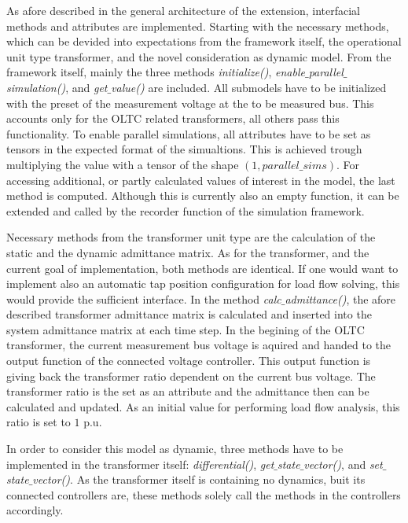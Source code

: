 As afore described in the general architecture of the extension, interfacial methods and attributes are implemented.
Starting with the necessary methods, which can be devided into expectations from the framework itself, the operational unit type transformer, and the novel consideration as dynamic model.
From the framework itself, mainly the three methods \textit{initialize()}, \textit{enable$\_$parallel$\_$simulation()}, and \textit{get$\_$value()} are included.
All submodels have to be initialized with the preset of the measurement voltage at the to be measured bus. 
This accounts only for the \acs{OLTC} related transformers, all others pass this functionality.
To enable parallel simulations, all attributes have to be set as tensors in the expected format of the simualtions.
This is achieved trough multiplying the value with a tensor of the shape $(1, {parallel\_sims})$.
For accessing additional, or partly calculated values of interest in the model, the last method is computed.
Although this is currently also an empty function, it can be extended and called by the recorder function of the simulation framework.

Necessary methods from the transformer unit type are the calculation of the static and the dynamic admittance matrix.
As for the transformer, and the current goal of implementation, both methods are identical.
If one would want to implement also an automatic tap position configuration for load flow solving, this would provide the sufficient interface.
In the method \textit{calc$\_$admittance()}, the afore described transformer admittance matrix is calculated and inserted into the system admittance matrix at each time step.
In the begining of the \acs{OLTC} transformer, the current measurement bus voltage is aquired and handed to the output function of the connected voltage controller.
This output function is giving back the transformer ratio dependent on the current bus voltage. 
The transformer ratio is the set as an attribute and the admittance then can be calculated and updated.
As an initial value for performing load flow analysis, this ratio is set to $1$ p.u.

In order to consider this model as dynamic, three methods have to be implemented in the transformer itself: \textit{differential()}, \textit{get$\_$state$\_$vector()}, and \textit{set$\_$state$\_$vector()}.
As the transformer itself is containing no dynamics, buit its connected controllers are, these methods solely call the methods in the controllers accordingly.

